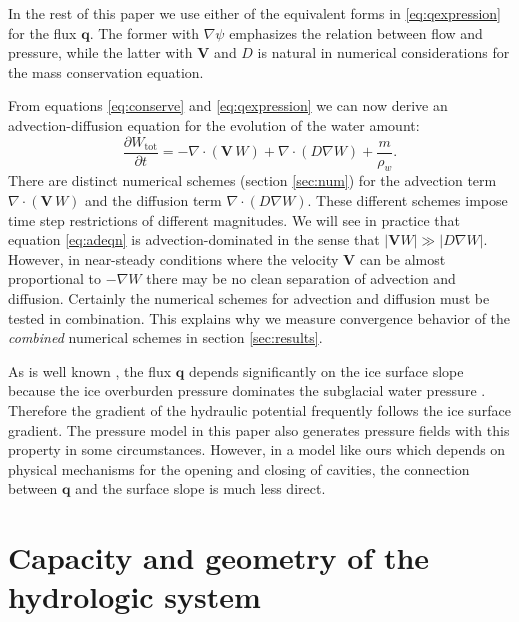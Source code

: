 \documentclass[11pt,final]{amsart}
\newcommand\bV{\mathbf{V}}
\newcommand\bq{\mathbf{q}}
\newcommand{\Div}{\nabla\cdot}
\newcommand{\grad}{\nabla}
\newcommand{\Wtot}{W_{\text{tot}}}
\begin{document}
In the rest of this paper we use either of the equivalent forms in \eqref{eq:qexpression} for the flux $\bq$.  The former with $\grad \psi$ emphasizes the relation between flow and pressure, while the latter with $\bV$ and $D$ is natural in numerical considerations for the mass conservation equation.

From equations \eqref{eq:conserve} and \eqref{eq:qexpression} we can now derive an advection-diffusion equation \citep{HundsdorferVerwer2010} for the evolution of the water amount:
\begin{equation} \label{eq:adeqn}
  \frac{\partial \Wtot}{\partial t} = - \Div\left(\bV\, W\right) + \Div \left(D \grad W\right) + \frac{m}{\rho_w}.
\end{equation}
There are distinct numerical schemes (section \ref{sec:num}) for the advection term $\Div\left(\bV\, W\right)$ and the diffusion term $\Div \left(D \grad W\right)$.  These different schemes impose time step restrictions of different magnitudes.  We will see in practice that equation \eqref{eq:adeqn} is advection-dominated in the sense that $|\bV W| \gg |D \grad W|$.  However, in near-steady conditions where the velocity $\bV$ can be almost proportional to $-\grad W$ there may be no clean separation of advection and diffusion.  Certainly the numerical schemes for advection and diffusion must be tested in combination.  This explains why we measure convergence behavior of the \emph{combined} numerical schemes in section \ref{sec:results}.

As is well known \citep{Clarke05}, the flux $\bq$ depends significantly on the ice surface slope because the ice overburden pressure dominates the subglacial water pressure \citep{Shreve1972}.  Therefore the gradient of the hydraulic potential frequently follows the ice surface gradient.  The pressure model in this paper also generates pressure fields with this property in some circumstances.  However, in a model like ours which depends on physical mechanisms for the opening and closing of cavities, the connection between $\bq$ and the surface slope is much less direct.



\section{Capacity and geometry of the hydrologic system} \label{sec:capacity}
\end{document}
